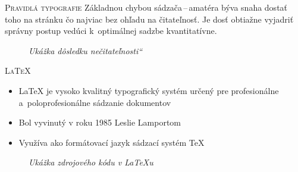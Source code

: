 \documentclass[xcolor=dvipsnames]{beamer}
\newcommand{\myuv}[1]{\quotedblbase #1\textquotedblleft}
\begin{document}
\begin{frame}{\textsc{\large{Pravidlá typografie}}}
	Základnou chybou sádzača\,--\,amatéra býva snaha dostať toho na stránku čo najviac bez ohľadu na čitateľnosť. Je dosť obtiažne vyjadriť správny postup vedúci k~optimálnej sadzbe kvantitatívne.
	\bigskip
	\begin{figure}[ht]
		\begin{center}
   			\caption{\textit{Ukážka dôsledku \myuv{nečitateľnosti}}}
		\end{center}
	\end{figure}
\end{frame}


\begin{frame}{\textsc{\large{\LaTeX}}}
	\begin{itemize}
		\item {\LaTeX} je vysoko kvalitný typografický systém určený pre profesionálne a~poloprofesionálne sádzanie dokumentov 
		\item Bol vyvinutý v roku 1985 Leslie Lamportom 
		\item Využíva ako formátovací jazyk sádzací systém {\TeX}
	\end{itemize}
	\begin{figure}[ht]
		\begin{center}
    		\caption{\textit{Ukážka zdrojového kódu v \LaTeX u}}
		\end{center}
	\end{figure}
\end{frame}
\end{document}
